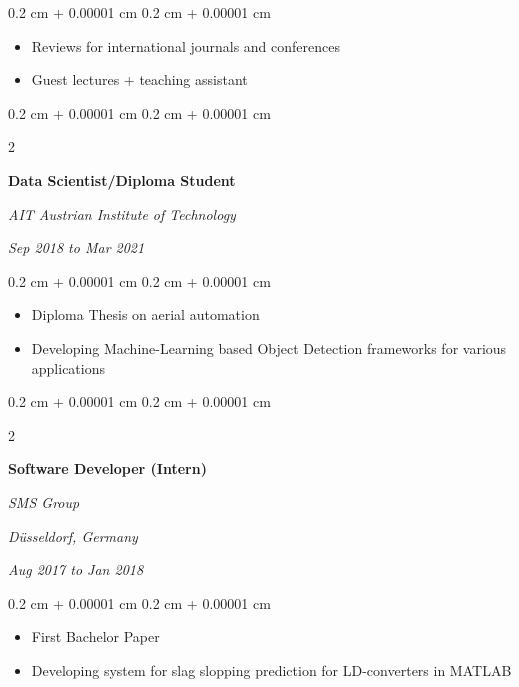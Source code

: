 \documentclass[10pt, letterpaper]{article}
\newenvironment{highlights}{
    \begin{itemize}[
        topsep=0.10 cm,
        parsep=0.10 cm,
        partopsep=0pt,
        itemsep=0pt,
        leftmargin=0.4 cm + 10pt
    ]
}{
    \end{itemize}
} %
\newenvironment{onecolentry}{
    \begin{adjustwidth}{
        0.2 cm + 0.00001 cm
    }{
        0.2 cm + 0.00001 cm
    }
}{
    \end{adjustwidth}
} %
\newenvironment{twocolentry}[2][]{
    \onecolentry
    \def\secondColumn{#2}
    \setcolumnwidth{\fill, 4.5 cm}
    \begin{paracol}{2}
}{
    \switchcolumn \raggedleft \secondColumn
    \end{paracol}
    \endonecolentry
} %
\begin{document}
        \vspace{0.10 cm}
        \begin{onecolentry}
            \begin{highlights}
                \item Reviews for international journals and conferences
                \item Guest lectures + teaching assistant
            \end{highlights}
        \end{onecolentry}


        \vspace{0.2 cm}

        \begin{twocolentry}{
            
            
        \textit{Sep 2018 to Mar 2021}}
            \textbf{Data Scientist/Diploma Student}
            
            \textit{AIT Austrian Institute of Technology}
        \end{twocolentry}

        \vspace{0.10 cm}
        \begin{onecolentry}
            \begin{highlights}
                \item Diploma Thesis on aerial automation
                \item Developing Machine-Learning based Object Detection frameworks for various applications
            \end{highlights}
        \end{onecolentry}


        \vspace{0.2 cm}

        \begin{twocolentry}{
        \textit{Düsseldorf, Germany}    
            
        \textit{Aug 2017 to Jan 2018}}
            \textbf{Software Developer (Intern)}
            
            \textit{SMS Group}
        \end{twocolentry}

        \vspace{0.10 cm}
        \begin{onecolentry}
            \begin{highlights}
                \item First Bachelor Paper
                \item Developing system for slag slopping prediction for LD-converters in MATLAB
            \end{highlights}
        \end{onecolentry}
\end{document}
